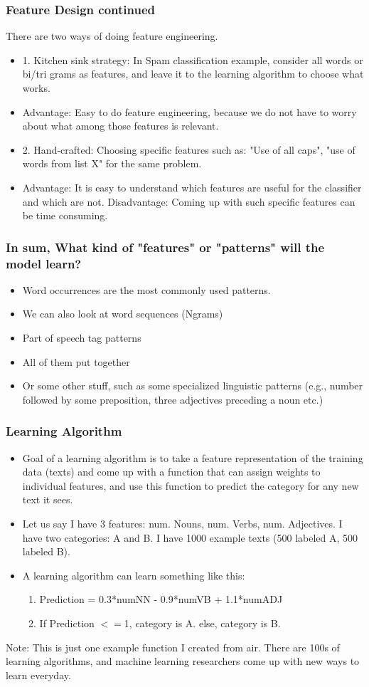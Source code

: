 \documentclass{beamer}
\begin{document}
\begin{frame}
\frametitle{Feature Design continued}
There are two ways of doing feature engineering.
\begin{itemize}
\item 1. Kitchen sink strategy: In Spam classification example, consider all words or bi/tri grams as features, and leave it to the learning algorithm to choose what works.
\item Advantage: Easy to do feature engineering, because we do not have to worry about what among those features is relevant.
\item 2. Hand-crafted: Choosing specific features such as: "Use of all caps", "use of words from list X" for the same problem. 
\item Advantage: It is easy to understand which features are useful for the classifier and which are not. Disadvantage: Coming up with such specific features can be time consuming.
\end{itemize}
\end{frame}

\begin{frame}
\frametitle{In sum, What kind of "features" or "patterns" will the model learn?}
\begin{itemize}
\item Word occurrences are the most commonly used patterns.
\item We can also look at word sequences (Ngrams)
\item Part of speech tag patterns
\item All of them put together
\item Or some other stuff, such as some specialized linguistic patterns (e.g., number followed by some preposition, three adjectives preceding a noun etc.)
\end{itemize}
\end{frame}


\begin{frame}
\frametitle{Learning Algorithm}
\begin{itemize}
\item Goal of a learning algorithm is to take a feature representation of the training data (texts) and come up with a function that can assign weights to individual features, and use this function to predict the category for any new text it sees. 
\item Let us say I have 3 features: num. Nouns, num. Verbs, num. Adjectives. I have two categories: A and B. I have 1000 example texts (500 labeled A, 500 labeled B).
\item A learning algorithm can learn something like this: 
\begin{enumerate}
\item Prediction = 0.3*numNN - 0.9*numVB + 1.1*numADJ
\item If Prediction $<=$1, category is A. else, category is B.
\end{enumerate}
\end{itemize}
Note: This is just one example function I created from air. There are 100s of learning algorithms, and machine learning researchers come up with new ways to learn everyday.
\end{frame}
\end{document}
